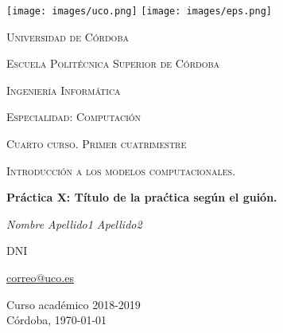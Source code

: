 \begin{titlepage}
\centering
\texttt{[image: images/uco.png]}
\texttt{[image: images/eps.png]}\par\vspace{1cm}
{\scshape\LARGE Universidad de Córdoba\par}
{\scshape\Large Escuela Politécnica Superior de Córdoba\par}
\vspace{1cm}
{\scshape\LARGE Ingeniería Informática\par}
{\scshape\Large Especialidad: Computación\par}
{\scshape\Large Cuarto curso. Primer cuatrimestre\par}
\vspace{1.5cm}
{\scshape\LARGE Introducción a los modelos computacionales.\par}
\vspace{1.5cm}
{\huge\bfseries Práctica X: Título de la praćtica según el guión.\par}
\vspace{1.2cm}
{\Large\itshape Nombre Apellido1 Apellido2\par}
DNI\par
\href{mailto:correo@uco.es}{correo@uco.es}\par
\vfill

{\large Curso académico 2018-2019\\Córdoba, \today\par}
\end{titlepage}